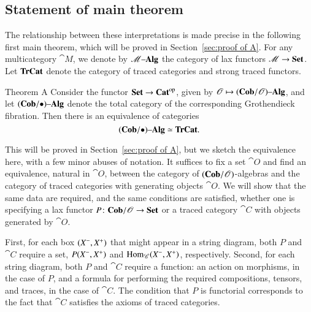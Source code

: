 \documentclass[12pt,oneside,article,draft]{memoir}
\begin{document}
\begin{enumerate}
\subsection{Statement of main theorem}\label{sec:statement of main thm}

The relationship between these interpretations is made precise in the following first main theorem, which will be proved in Section~\ref{sec:proof of A}.
For any multicategory $\cat{M}$, we denote by $\mathscr{M}{\text \textendash}\mathbf{Alg}$ the category of lax functors $\mathscr{M}\to\mathbf{Set}$.
Let $\mathbf{TrCat}$ denote the category of traced categories and strong traced functors.

\begin{named}{Theorem A}
	Consider the functor $\mathbf{Set}\to{\mathbf{Cat}}^{\text{op}}$, given by $\mathscr{O}\mapsto(\mathbf{Cob}/\mathscr{O}){\text \textendash}\mathbf{Alg}$, and let $(\mathbf{Cob}/\bullet){\text \textendash}\mathbf{Alg}$ denote the total category of the corresponding Grothendieck fibration.
	Then there is an equivalence of categories
	$$(\mathbf{Cob}/\bullet){\text \textendash}\mathbf{Alg}\simeq\mathbf{TrCat}.$$
\end{named}

This will be proved in Section~\ref{sec:proof of A}, but we sketch the equivalence here, with a few minor abuses of notation.
It suffices to fix a set $\cat{O}$ and find an equivalence, natural in $\cat{O}$, between the category of $(\mathbf{Cob}/\mathscr{O})$-algebras and the category of traced categories with generating objects $\cat{O}$.
We will show that the same data are required, and the same conditions are satisfied, whether one is specifying a lax functor $P\colon\mathbf{Cob}/\mathscr{O}\to\mathbf{Set}$ or a traced category $\cat{C}$ with objects generated by $\cat{O}$. 

First, for each box $(X^-,X^+)$ that might appear in a string diagram, both $P$ and $\cat{C}$ require a set, $P(X^-,X^+)$ and $\operatorname{Hom}_{\mathscr{C}}(X^-,X^+)$, respectively.
Second, for each string diagram, both $P$ and $\cat{C}$ require a function: an action on morphisms, in the case of $P$, and a formula for performing the required compositions, tensors, and traces, in the case of $\cat{C}$.
The condition that $P$ is functorial corresponds to the fact that $\cat{C}$ satisfies the axioms of traced categories. 


\end{enumerate}
\end{document}
